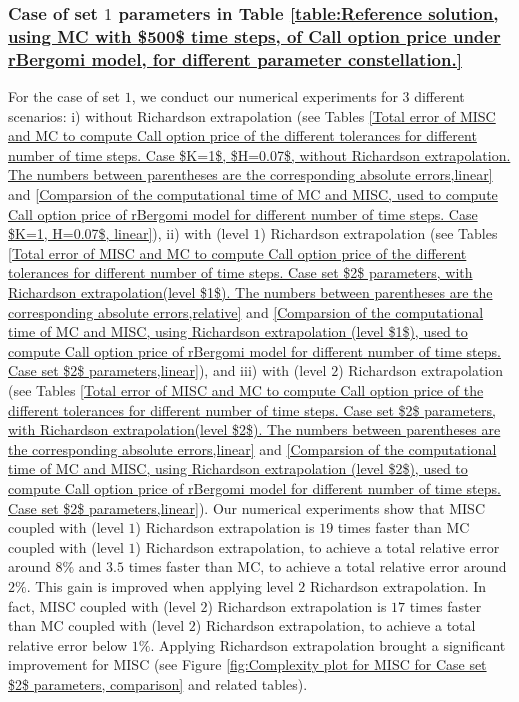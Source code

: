 \subsubsection{Case of set $1$ parameters in Table \ref{table:Reference solution, using MC with $500$ time steps, of Call option price under rBergomi model, for different parameter constellation.} }
\label{sec:Case of set $2$ parameters_linear}

For the case of set $1$, we conduct our numerical experiments for $3$ different scenarios: i) without Richardson extrapolation (see Tables \ref{Total error of MISC and MC to compute Call option price of the different tolerances for different number of time steps. Case $K=1$, $H=0.07$, without Richardson extrapolation. The numbers between parentheses are the corresponding absolute errors,linear} and \ref{Comparsion of the computational time of  MC and MISC, used to compute Call option price of rBergomi model for different number of time steps. Case $K=1, H=0.07$, linear}), ii) with (level $1$) Richardson extrapolation (see Tables \ref{Total  error of MISC and MC to compute Call option price of the different tolerances for different number of time steps. Case set $2$ parameters, with Richardson extrapolation(level $1$). The numbers between parentheses are the corresponding absolute errors,relative} and \ref{Comparsion of the computational time of  MC and MISC, using Richardson extrapolation (level $1$), used to compute Call option price of rBergomi model for different number of time steps. Case set $2$ parameters,linear}), and iii) with (level $2$) Richardson extrapolation (see Tables \ref{Total  error of MISC and MC to compute Call option price of the different tolerances for different number of time steps. Case set $2$ parameters, with Richardson extrapolation(level $2$). The numbers between parentheses are the corresponding absolute errors,linear} and \ref{Comparsion of the computational time of  MC and MISC, using Richardson extrapolation (level $2$), used to compute Call option price of rBergomi model for different number of time steps. Case set $2$ parameters,linear}).  Our numerical experiments show that  MISC coupled with (level $1$) Richardson extrapolation is $19$ times faster than MC coupled with (level $1$) Richardson extrapolation, to achieve a total relative error around $8\%$ and $3.5$ times faster than MC, to achieve a total relative error around $2\%$. This gain is improved when applying level $2$ Richardson extrapolation. In fact,  MISC coupled with (level $2$)  Richardson extrapolation is $17$ times faster than MC coupled with (level $2$)  Richardson extrapolation, to achieve a total relative error below  $1\%$. Applying Richardson extrapolation brought a significant improvement for MISC (see Figure \ref{fig:Complexity plot for  MISC for Case set $2$ parameters, comparison} and related tables).

